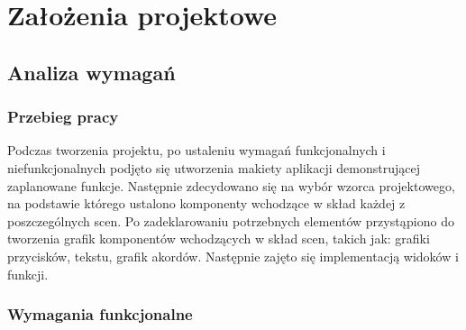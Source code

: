 \chapter{Założenia projektowe}

\section{Analiza wymagań}

\subsection{Przebieg pracy}

Podczas tworzenia projektu, po ustaleniu wymagań funkcjonalnych i niefunkcjonalnych podjęto się utworzenia makiety aplikacji demonstrującej zaplanowane funkcje. Następnie zdecydowano się na wybór wzorca projektowego, na podstawie którego ustalono komponenty wchodzące w skład każdej z poszczególnych scen. Po zadeklarowaniu potrzebnych elementów przystąpiono do tworzenia grafik komponentów wchodzących w skład scen, takich jak: grafiki przycisków, tekstu, grafik akordów. Następnie zajęto się implementacją widoków i funkcji.

\subsection{Wymagania funkcjonalne}

